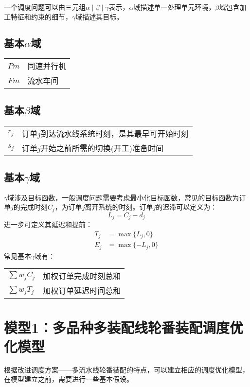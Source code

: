 一个调度问题可以由三元组$\alpha \mid \beta \mid \gamma$表示，$\alpha$域描述单一处理单元环境，$\beta$域包含加工特征和约束的细节，$\gamma$域描述其目标\cite{pinedo}。

\subsection{基本$\alpha$域}
\begin{supertabular}{ll}
$Pm$ & 同速并行机\\
$Fm$ & 流水车间\\
\end{supertabular}

\subsection{基本$\beta$域}
\begin{supertabular}{ll}
$r_j$ & 订单$j$到达流水线系统时刻，是其最早可开始时刻\\
$s_j$ & 订单$j$开始之前所需的切换(开工)准备时间\\
\end{supertabular}

\subsection{基本$\gamma$域}
$\gamma$域涉及目标函数，一般调度问题需要考虑最小化目标函数，常见的目标函数为订单$j$的完成时刻$C_j$，为订单$j$离开系统的时刻。订单$j$的迟滞可以定义为：
\[
L_j = C_j - d_j
\]
进一步可定义其延迟和提前：
\begin{align*}
T_j & = \max\{L_j,0\}\\
E_j & = \max\{-L_j,0\}
\end{align*}
常见基本$\gamma$域有：\\[3pt]
\begin{supertabular}{ll}
$\sum w_jC_j$ & 加权订单完成时刻总和 \\
$\sum w_jT_j$ & 加权订单延迟时间总和 \\
\end{supertabular}

\section{模型1：多品种多装配线轮番装配调度优化模型}
根据改进调度方案——多流水线轮番装配的特点，可以建立相应的调度优化模型，在模型建立之前，需要进行一些基本假设。
